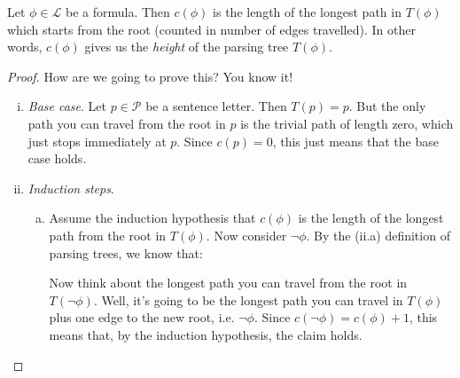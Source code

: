 \begin{enumerate}[\thesection.1]
	\begin{proposition}
	Let $\phi\in\mathcal{L}$ be a formula. Then $c(\phi)$ is the length of the longest path in $T(\phi)$ which starts from the root (counted in number of edges travelled). In other words, $c(\phi)$ gives us the \emph{height} of the parsing tree $T(\phi)$.
	\end{proposition}
	\begin{proof}
	How are we going to prove this? You know it!
	
\begin{enumerate}[(i)]
		
			\item \emph{Base case}. Let $p\in\mathcal{P}$ be a sentence letter. Then $T(p)=p$. But the only path you can travel from the root in $p$ is the trivial path of length zero, which just stops immediately at $p$. Since $c(p)=0$, this just means that the base case holds.
			
			\item \emph{Induction steps}. 
				\begin{enumerate}[(a)]

					\item Assume the induction hypothesis that $c(\phi)$ is the length of the longest path from the root in $T(\phi)$. Now consider $\neg \phi$. By the (ii.a) definition of parsing trees, we know that:
					\begin{center}
\end{center}
Now think about the longest path you can travel from the root in $T(\neg\phi)$. Well, it's going to be the longest path you can travel in $T(\phi)$ plus one edge to the new root, i.e. $\neg\phi$. Since $c(\neg\phi)=c(\phi)+1$, this means that, by the induction hypothesis, the claim holds.


\end{enumerate}
\end{enumerate}
\end{proof}
\end{enumerate}
